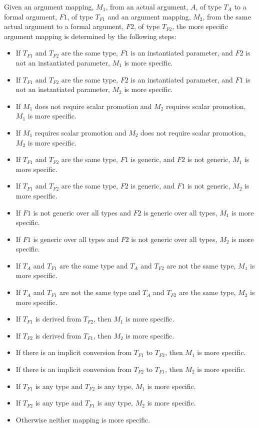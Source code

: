 Given an argument mapping, $M_1$, from an actual argument, $A$, of
type $T_A$ to a formal argument, $F1$, of type $T_{F1}$ and an
argument mapping, $M_2$, from the same actual argument to a formal
argument, $F2$, of type $T_{F2}$, the more specific argument mapping
is determined by the following steps:
\begin{itemize}
\item
 If $T_{F1}$ and $T_{F2}$ are the same type, $F1$ is an instantiated
 parameter, and $F2$ is not an instantiated parameter, $M_1$ is more
 specific.
\item
 If $T_{F1}$ and $T_{F2}$ are the same type, $F2$ is an instantiated
 parameter, and $F1$ is not an instantiated parameter, $M_2$ is more
 specific.
\item
 If $M_1$ does not require scalar promotion and $M_2$ requires scalar
 promotion, $M_1$ is more specific.
\item
 If $M_1$ requires scalar promotion and $M_2$ does not require scalar
 promotion, $M_2$ is more specific.
\item
 If $T_{F1}$ and $T_{F2}$ are the same type, $F1$ is generic, and $F2$
 is not generic, $M_1$ is more specific.
\item
 If $T_{F1}$ and $T_{F2}$ are the same type, $F2$ is generic, and $F1$
 is not generic, $M_2$ is more specific.
\item
 If $F1$ is not generic over all types and $F2$ is generic over all
 types, $M_1$ is more specific.
\item
 If $F1$ is generic over all types and $F2$ is not generic over all
 types, $M_2$ is more specific.
\item
 If $T_A$ and $T_{F1}$ are the same type and $T_A$ and $T_{F2}$ are
 not the same type, $M_1$ is more specific.
\item
 If $T_A$ and $T_{F1}$ are not the same type and $T_A$ and $T_{F2}$
 are the same type, $M_2$ is more specific.
\item
 If $T_{F1}$ is derived from $T_{F2}$, then $M_1$ is more specific.
\item
 If $T_{F2}$ is derived from $T_{F1}$, then $M_2$ is more specific.
\item
 If there is an implicit conversion from $T_{F1}$ to $T_{F2}$, then
 $M_1$ is more specific.
\item
 If there is an implicit conversion from $T_{F2}$ to $T_{F1}$, then
 $M_2$ is more specific.
\item
 If $T_{F1}$ is any  type and $T_{F2}$ is any 
 type, $M_1$ is more specific.
\item
 If $T_{F2}$ is any  type and $T_{F1}$ is any 
 type, $M_2$ is more specific.
\item
 Otherwise neither mapping is more specific.
\end{itemize}


